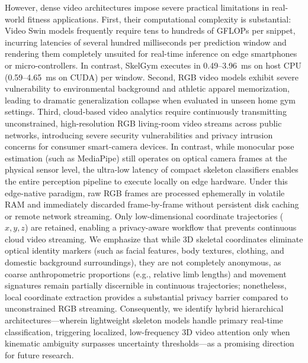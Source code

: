 \documentclass[runningheads]{llncs}
\begin{document}
However, dense video architectures impose severe practical limitations in real-world fitness applications. First, their computational complexity is substantial: Video Swin models frequently require tens to hundreds of GFLOPs per snippet, incurring latencies of several hundred milliseconds per prediction window and rendering them completely unsuited for real-time inference on edge smartphones or micro-controllers. In contrast, SkelGym executes in 0.49--3.96~ms on host CPU (0.59--4.65~ms on CUDA) per window. Second, RGB video models exhibit severe vulnerability to environmental background and athletic apparel memorization, leading to dramatic generalization collapse when evaluated in unseen home gym settings. Third, cloud-based video analytics require continuously transmitting unconstrained, high-resolution RGB living-room video streams across public networks, introducing severe security vulnerabilities and privacy intrusion concerns for consumer smart-camera devices. In contrast, while monocular pose estimation (such as MediaPipe) still operates on optical camera frames at the physical sensor level, the ultra-low latency of compact skeleton classifiers enables the entire perception pipeline to execute locally on edge hardware. Under this edge-native paradigm, raw RGB frames are processed ephemerally in volatile RAM and immediately discarded frame-by-frame without persistent disk caching or remote network streaming. Only low-dimensional coordinate trajectories ($x, y, z$) are retained, enabling a privacy-aware workflow that prevents continuous cloud video streaming. We emphasize that while 3D skeletal coordinates eliminate optical identity markers (such as facial features, body textures, clothing, and domestic background surroundings), they are not completely anonymous, as coarse anthropometric proportions (e.g., relative limb lengths) and movement signatures remain partially discernible in continuous trajectories; nonetheless, local coordinate extraction provides a substantial privacy barrier compared to unconstrained RGB streaming. Consequently, we identify hybrid hierarchical architectures---wherein lightweight skeleton models handle primary real-time classification, triggering localized, low-frequency 3D video attention only when kinematic ambiguity surpasses uncertainty thresholds---as a promising direction for future research.
\end{document}

